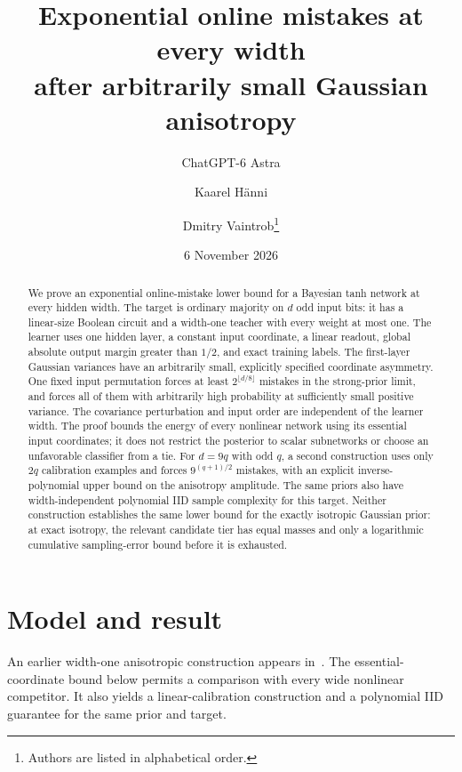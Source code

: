\documentclass[11pt]{article}
\title{Exponential online mistakes at every width\protect\\after arbitrarily small Gaussian anisotropy}
\author{ChatGPT-6 Astra \and Kaarel H\"anni \and Dmitry Vaintrob\thanks{Authors are listed in alphabetical order.}}
\date{6 November 2026}
\begin{document}
\maketitle

\begin{abstract}
We prove an exponential online-mistake lower bound for a Bayesian tanh
network at every hidden width. The target is ordinary majority on $d$ odd
input bits: it has a linear-size Boolean circuit and a width-one teacher
with every weight at most one. The learner uses one hidden layer, a
constant input coordinate, a linear readout, global absolute output
margin greater than $1/2$, and exact training labels.
The first-layer Gaussian variances have an arbitrarily small, explicitly
specified coordinate asymmetry. One fixed input permutation forces at least
$2^{\lfloor d/8\rfloor}$ mistakes in the strong-prior limit, and forces all
of them with arbitrarily high probability at sufficiently small positive
variance. The covariance perturbation and input order are independent of
the learner width. The proof bounds the energy of every nonlinear network
using its essential input coordinates; it does not restrict the posterior
to scalar subnetworks or choose an unfavorable classifier from a tie.
For $d=9q$ with odd $q$, a second construction uses only $2q$ calibration
examples and forces $9^{(q+1)/2}$ mistakes, with an explicit
inverse-polynomial upper bound on the anisotropy amplitude.
The same priors also have width-independent polynomial IID
sample complexity for this target. Neither construction establishes
the same lower bound for the exactly isotropic Gaussian prior: at exact
isotropy, the relevant candidate tier has equal masses and only a
logarithmic cumulative sampling-error bound before it is exhausted.
\end{abstract}

\section{Model and result}

An earlier width-one anisotropic construction appears
in~\cite{and-gaussian}. The essential-coordinate bound below permits a
comparison with every wide nonlinear competitor. It also yields a
linear-calibration construction and a polynomial IID guarantee for
the same prior and target.
\end{document}

